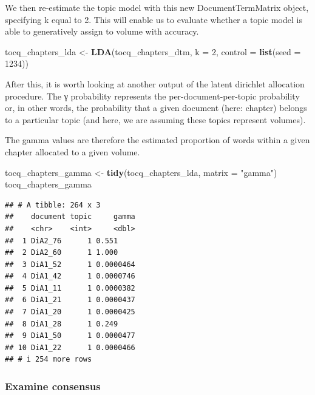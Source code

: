 \documentclass[
]{article}
\newenvironment{Shaded}{\begin{snugshade}}{\end{snugshade}}
\newcommand{\AttributeTok}[1]{\textcolor[rgb]{0.13,0.29,0.53}{#1}}
\newcommand{\DecValTok}[1]{\textcolor[rgb]{0.00,0.00,0.81}{#1}}
\newcommand{\FunctionTok}[1]{\textcolor[rgb]{0.13,0.29,0.53}{\textbf{#1}}}
\newcommand{\NormalTok}[1]{#1}
\newcommand{\OtherTok}[1]{\textcolor[rgb]{0.56,0.35,0.01}{#1}}
\newcommand{\StringTok}[1]{\textcolor[rgb]{0.31,0.60,0.02}{#1}}
\begin{document}
We then re-estimate the topic model with this new DocumentTermMatrix
object, specifying k equal to 2. This will enable us to evaluate whether
a topic model is able to generatively assign to volume with accuracy.

\begin{Shaded}
\begin{Highlighting}[]
\NormalTok{tocq\_chapters\_lda }\OtherTok{\textless{}{-}} \FunctionTok{LDA}\NormalTok{(tocq\_chapters\_dtm, }\AttributeTok{k =} \DecValTok{2}\NormalTok{, }\AttributeTok{control =} \FunctionTok{list}\NormalTok{(}\AttributeTok{seed =} \DecValTok{1234}\NormalTok{))}
\end{Highlighting}
\end{Shaded}

After this, it is worth looking at another output of the latent
dirichlet allocation procedure. The γ probability represents the
per-document-per-topic probability or, in other words, the probability
that a given document (here: chapter) belongs to a particular topic (and
here, we are assuming these topics represent volumes).

The gamma values are therefore the estimated proportion of words within
a given chapter allocated to a given volume.

\begin{Shaded}
\begin{Highlighting}[]
\NormalTok{tocq\_chapters\_gamma }\OtherTok{\textless{}{-}} \FunctionTok{tidy}\NormalTok{(tocq\_chapters\_lda, }\AttributeTok{matrix =} \StringTok{"gamma"}\NormalTok{)}
\NormalTok{tocq\_chapters\_gamma}
\end{Highlighting}
\end{Shaded}

\begin{verbatim}
## # A tibble: 264 x 3
##    document topic     gamma
##    <chr>    <int>     <dbl>
##  1 DiA2_76      1 0.551    
##  2 DiA2_60      1 1.000    
##  3 DiA1_52      1 0.0000464
##  4 DiA1_42      1 0.0000746
##  5 DiA1_11      1 0.0000382
##  6 DiA1_21      1 0.0000437
##  7 DiA1_20      1 0.0000425
##  8 DiA1_28      1 0.249    
##  9 DiA1_50      1 0.0000477
## 10 DiA1_22      1 0.0000466
## # i 254 more rows
\end{verbatim}

\subsubsection{Examine consensus}\label{examine-consensus}
\end{document}
